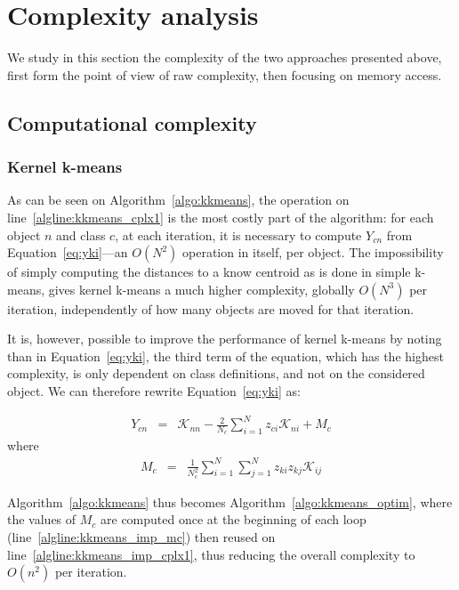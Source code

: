\documentclass[a4paper,twoside]{article}
\newcommand{\cad}{---} %
\begin{document}
\section{Complexity analysis}
\label{sec:complexity}

We study in this section the complexity of the two approaches presented above, first form the point of view of raw complexity, then focusing on memory access.

\subsection{Computational complexity}

\subsubsection{Kernel k-means}

As can be seen on Algorithm~\ref{algo:kkmeans}, the operation on line~\ref{algline:kkmeans_cplx1} is the most costly part of the algorithm: for each object $n$ and class $c$, at each iteration, it is necessary to compute $Y_{cn}$ from Equation~\ref{eq:yki}\cad{}an $O(N^2)$ operation in itself, per object. The impossibility of simply computing the distances to a know centroid as is done in simple k-means, gives kernel k-means a much higher complexity, globally $O(N^3)$ per iteration, independently of how many objects are moved for that iteration.

It is, however, possible to improve the performance of kernel k-means by noting than in Equation~\ref{eq:yki}, the third term of the equation, which has the highest complexity, is only dependent on class definitions, and not on the considered object. We can therefore rewrite Equation~\ref{eq:yki} as:

\begin{eqnarray}
Y_{cn} & = & \mathcal{K}_{nn} - \frac{2}{N_c} \sum_{i=1}^{N} z_{ci} \mathcal{K}_{ni} + M_c \label{eq:yki_improved}
\end{eqnarray}
where
\begin{eqnarray}
M_c    & = & \frac{1}{N_c^2} \sum_{i=1}^{N} \sum_{j=1}^{N} z_{ki} z_{kj} \mathcal{K}_{ij} \label{eq:mc}
\end{eqnarray}

Algorithm~\ref{algo:kkmeans} thus becomes Algorithm~\ref{algo:kkmeans_optim}, where the values of $M_c$ are computed once at the beginning of each loop (line~\ref{algline:kkmeans_imp_mc}) then reused on line~\ref{algline:kkmeans_imp_cplx1}, thus reducing the overall complexity to $O(n^2)$ per iteration.
\end{document}
